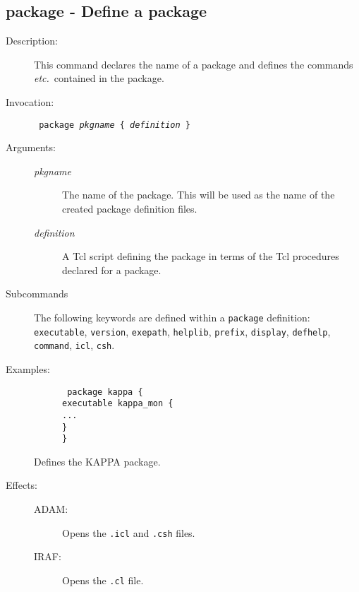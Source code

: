 \documentclass[twoside,11pt]{article}
\newcommand{\htmlref}[2]{#1}
\newcommand{\xlabel}[1]{}
\newcommand{\tab}{\>}
\renewcommand{\tab}{   }
\newlength{\sstbannerlength}
\newlength{\sstcaptionlength}
\newlength{\sstexampleslength}
\newlength{\sstexampleswidth}
\newcommand{\sstroutine}[3]{
   \goodbreak
   \rule{\textwidth}{0.5mm}
   \vspace{-7ex}
   \newline
   \settowidth{\sstbannerlength}{{\Large {\bf #1}}}
   \setlength{\sstcaptionlength}{\textwidth}
   \setlength{\sstexampleslength}{\textwidth}
   \addtolength{\sstbannerlength}{0.5em}
   \addtolength{\sstcaptionlength}{-2.0\sstbannerlength}
   \addtolength{\sstcaptionlength}{-5.0pt}
   \settowidth{\sstexampleswidth}{{\bf Examples:}}
   \addtolength{\sstexampleslength}{-\sstexampleswidth}
   \parbox[t]{\sstbannerlength}{\flushleft{\Large {\bf #1}}}
   \parbox[t]{\sstcaptionlength}{\center{\Large #2}}
   \parbox[t]{\sstbannerlength}{\flushright{\Large {\bf #1}}}
   \begin{description}
      #3
   \end{description}
}
\newcommand{\sstdescription}[1]{\item[Description:] #1}
\newcommand{\sstinvocation}[1]{\item[Invocation:]\hspace{0.4em}{\tt #1}}
\newcommand{\ssteffects}[1]{
   \item[Effects:] \mbox{} \\
   \vspace{-3.5ex}
   \begin{description}
      #1
   \end{description}
}
\newcommand{\sstarguments}[1]{
   \item[Arguments:] \mbox{} \\
   \vspace{-3.5ex}
   \begin{description}
      #1
   \end{description}
}
\newcommand{\sstexamples}[1]{
   \item[Examples:] \mbox{}
      #1
}
\newcommand{\sstsubsection}[1]{ \item[{#1}] \mbox{} \\}
\newcommand{\sstexamplesubsection}[2]
{   \vspace{-5ex}
\begin{quote} \texttt{\begin{tabbing}
xxx\=xxx\=\kill
#1
\end{tabbing}}
\end{quote}
#2}
\newcommand{\sstdiytopic}[2]{\item[{\hspace{-0.35em}#1\hspace{-0.35em}:}] \mbox{} \\[1.3ex] #2}
\newcommand{\ssttt}{\tt}
\renewcommand{\sstroutine}[3]{
      \subsection{#1\xlabel{#1}-\label{#1}#2}
      \begin{description}
         #3
      \end{description}
   }
\renewcommand{\sstdescription}[1]{\item[Description:]
      \begin{description}
         #1
      \end{description}
   }
\renewcommand{\sstinvocation}[1]{\item[Invocation:]
      \begin{description}
         {\ssttt #1}
      \end{description}
   }
\renewcommand{\ssteffects}[1]{
      \item[Effects:]
      \begin{description}
         #1
      \end{description}
   }
\renewcommand{\sstarguments}[1]{
      \item[Arguments:]
      \begin{description}
         #1
      \end{description}
   }
\renewcommand{\sstexamples}[1]{
      \item[Examples:]
      \begin{description}
         #1
      \end{description}
   }
\renewcommand{\sstsubsection}[1]{\item[{#1}]}
\renewcommand{\sstexamplesubsection}[2]{\item[] {\ssttt #1} \\ \item[#2]}
\renewcommand{\sstdiytopic}[2]{\item[{#1}]
      \begin{description}
         #2
      \end{description}
   }
\begin{document}
\sstroutine{
   package
}{
   Define a package
}{
   \sstdescription{
      This command declares the name of a package and defines the commands
      \textit{etc.}\ contained in the package.
   }
   \sstinvocation{
      package \textit{pkgname} \{ \textit{definition} \}
   }
   \sstarguments{
      \sstsubsection{
         \textit{pkgname}
      }{
         The name of the package. This will be used as the name of the created
         package definition files.
      }
      \sstsubsection{
         \textit{definition}
      }
         A Tcl script defining the package in terms of the Tcl procedures
         declared for a package.
   }
   \sstdiytopic{Subcommands}{
      The following keywords are defined within a \texttt{package} definition:
      \htmlref{{\ssttt executable}}{executable},
      \htmlref{{\ssttt version}}{version},
      \htmlref{{\ssttt exepath}}{exepath},
      \htmlref{{\ssttt helplib}}{helplib},
      \htmlref{{\ssttt prefix}}{prefix},
      \htmlref{{\ssttt display}}{display},
      \htmlref{{\ssttt defhelp}}{defhelp},
      \htmlref{{\ssttt command}}{command},
      \htmlref{{\ssttt icl}}{icl},
      \htmlref{{\ssttt csh}}{csh}.
   }
   \sstexamples{
      \sstexamplesubsection{
         package kappa \{\\
         \tab executable kappa\_mon \{\\
         \tab \tab ...\\
         \tab \}\\
         \}
      }{
         Defines the KAPPA package.
      }
   }
   \ssteffects{
      \sstsubsection{ADAM:}{Opens the {\ssttt .icl} and {\ssttt .csh} files.}
      \sstsubsection{IRAF:}{Opens the {\ssttt .cl} file.}
   }
}
\end{document}
